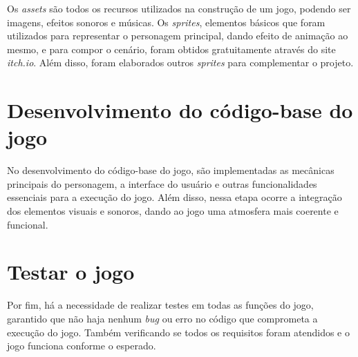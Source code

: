 Os \textit{assets} são todos os recursos utilizados na construção de um jogo, podendo ser imagens, efeitos sonoros e músicas. Os \textit{sprites}, elementos básicos que foram utilizados para representar o personagem principal, dando efeito de animação ao mesmo, e para compor o cenário, foram obtidos gratuitamente através do site \textit{itch.io}. Além disso, foram elaborados outros \textit{sprites} para complementar o projeto.

\section{Desenvolvimento do código-base do jogo}

No desenvolvimento do código-base do jogo, são implementadas as mecânicas principais do personagem, a interface do usuário e outras funcionalidades essenciais para a execução do jogo. Além disso, nessa etapa ocorre a integração dos elementos visuais e sonoros, dando ao jogo uma atmosfera mais coerente e funcional.

\section{Testar o jogo}

Por fim, há a necessidade de realizar testes em todas as funções do jogo, garantido que não haja nenhum \textit{bug} ou erro no código que comprometa a execução do jogo. Também verificando se todos os requisitos foram atendidos e o jogo funciona conforme o esperado.